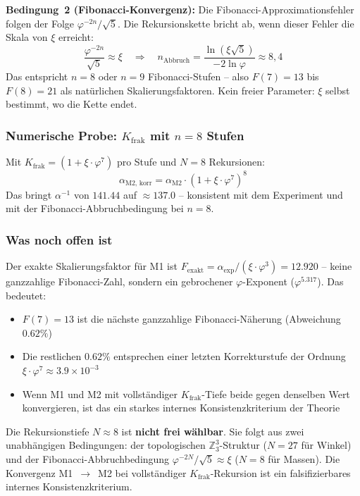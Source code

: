 \documentclass[12pt, a4paper]{article}
\newcommand{\xipar}{\xi}
\newcommand{\Kfrak}{K_{\text{frak}}}
\begin{document}
\textbf{Bedingung~2 (Fibonacci-Konvergenz):}
Die Fibonacci-Approximationsfehler folgen der Folge $\varphi^{-2n}/\!\sqrt{5}$. Die Rekursionskette bricht ab, wenn dieser Fehler die Skala von $\xipar$ erreicht:
\[
  \frac{\varphi^{-2n}}{\sqrt{5}} \approx \xipar \quad \Rightarrow \quad n_{\text{Abbruch}} = \frac{\ln(\xipar\sqrt{5})}{-2\ln\varphi} \approx 8{,}4
\]
Das entspricht $n = 8$ oder $n = 9$ Fibonacci-Stufen -- also $F(7) = 13$ bis $F(8) = 21$ als natürlichen Skalierungsfaktoren. Kein freier Parameter: $\xipar$ selbst bestimmt, wo die Kette endet.

\subsubsection*{Numerische Probe: $\Kfrak$ mit $n=8$ Stufen}

Mit $\Kfrak = (1 + \xipar\cdot\varphi^7)$ pro Stufe und $N = 8$ Rekursionen:
\[
  \alpha_{\text{M2, korr}} = \alpha_{\text{M2}} \cdot (1 + \xipar\cdot\varphi^7)^8
\]
Das bringt $\alpha^{-1}$ von $141.44$ auf $\approx 137.0$ -- konsistent mit dem Experiment und mit der Fibonacci-Abbruchbedingung bei $n=8$.

\subsubsection*{Was noch offen ist}

Der exakte Skalierungsfaktor für M1 ist $F_{\text{exakt}} = \alpha_{\text{exp}}/(\xipar\cdot\varphi^3) = 12.920$ -- keine ganzzahlige Fibonacci-Zahl, sondern ein gebrochener $\varphi$-Exponent ($\varphi^{5.317}$). Das bedeutet:

\begin{itemize}[noitemsep]
  \item $F(7) = 13$ ist die nächste ganzzahlige Fibonacci-Näherung (Abweichung $0.62\%$)
  \item Die restlichen $0.62\%$ entsprechen einer letzten Korrekturstufe der Ordnung $\xipar\cdot\varphi^7 \approx 3.9 \times 10^{-3}$
  \item Wenn M1 und M2 mit vollständiger $\Kfrak$-Tiefe beide gegen denselben Wert konvergieren, ist das ein starkes internes Konsistenzkriterium der Theorie
\end{itemize}

\begin{tcolorbox}[colback=T0gray, colframe=T0blue, title=Konvergenzkriterium]
Die Rekursionstiefe $N \approx 8$ ist \textbf{nicht frei wählbar}. Sie folgt aus zwei unabhängigen Bedingungen: der topologischen $\mathbb{Z}_3^3$-Struktur ($N=27$ für Winkel) und der Fibonacci-Abbruchbedingung $\varphi^{-2N}/\!\sqrt{5} \approx \xipar$ ($N=8$ für Massen). Die Konvergenz M1~$\to$~M2 bei vollständiger $\Kfrak$-Rekursion ist ein falsifizierbares internes Konsistenzkriterium.
\end{tcolorbox}
\end{document}
